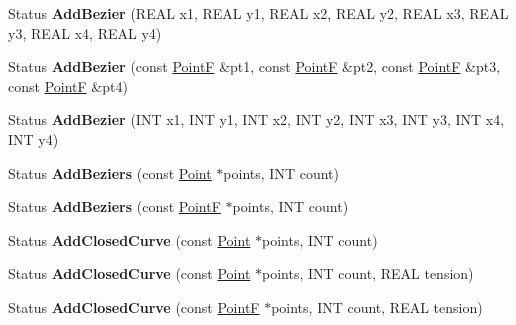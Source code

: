\begin{DoxyCompactItemize}
\item 
\mbox{\label{class_graphics_path_acf2db4744756ddb936813046511d8817}} 
Status {\bfseries Add\+Bezier} (R\+E\+AL x1, R\+E\+AL y1, R\+E\+AL x2, R\+E\+AL y2, R\+E\+AL x3, R\+E\+AL y3, R\+E\+AL x4, R\+E\+AL y4)
\item 
\mbox{\label{class_graphics_path_af575e4063584d54a3c61ae9bd0c8f4d0}} 
Status {\bfseries Add\+Bezier} (const \hyperlink{struct_point_f}{PointF} \&pt1, const \hyperlink{struct_point_f}{PointF} \&pt2, const \hyperlink{struct_point_f}{PointF} \&pt3, const \hyperlink{struct_point_f}{PointF} \&pt4)
\item 
\mbox{\label{class_graphics_path_a2993e58416db429f18e24a3a6fa2bcfd}} 
Status {\bfseries Add\+Bezier} (I\+NT x1, I\+NT y1, I\+NT x2, I\+NT y2, I\+NT x3, I\+NT y3, I\+NT x4, I\+NT y4)
\item 
\mbox{\label{class_graphics_path_a3fb11ae31d07c6a49f1a6e3165a42efe}} 
Status {\bfseries Add\+Beziers} (const \hyperlink{struct_point}{Point} $\ast$points, I\+NT count)
\item 
\mbox{\label{class_graphics_path_abf4e161008c7ae59c4967adc410d9082}} 
Status {\bfseries Add\+Beziers} (const \hyperlink{struct_point_f}{PointF} $\ast$points, I\+NT count)
\item 
\mbox{\label{class_graphics_path_a65fd391789810b35d73f69d58123bc50}} 
Status {\bfseries Add\+Closed\+Curve} (const \hyperlink{struct_point}{Point} $\ast$points, I\+NT count)
\item 
\mbox{\label{class_graphics_path_a144a65b78785dcbbc1f579bc4ffbc3eb}} 
Status {\bfseries Add\+Closed\+Curve} (const \hyperlink{struct_point}{Point} $\ast$points, I\+NT count, R\+E\+AL tension)
\item 
\mbox{\label{class_graphics_path_ad6eb2aa68ed5c2f47fa5b975d14caa92}} 
Status {\bfseries Add\+Closed\+Curve} (const \hyperlink{struct_point_f}{PointF} $\ast$points, I\+NT count, R\+E\+AL tension)
\item 
\mbox{\label{class_graphics_path_ac8931b75e446c1f41d97011381128555}} 

\end{DoxyCompactItemize}
